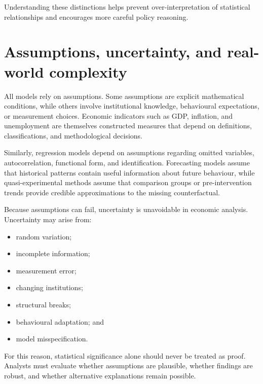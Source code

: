 \documentclass[
  11pt,
  oneside]{book}
\providecommand{\tightlist}{%
  \setlength{\itemsep}{0pt}\setlength{\parskip}{0pt}}
\begin{document}
Understanding these distinctions helps prevent over-interpretation of statistical relationships and encourages more careful policy reasoning.

\section{Assumptions, uncertainty, and real-world complexity}\label{assumptions-uncertainty-and-real-world-complexity}

All models rely on assumptions. Some assumptions are explicit mathematical conditions, while others involve institutional knowledge, behavioural expectations, or measurement choices. Economic indicators such as GDP, inflation, and unemployment are themselves constructed measures that depend on definitions, classifications, and methodological decisions.

Similarly, regression models depend on assumptions regarding omitted variables, autocorrelation, functional form, and identification. Forecasting models assume that historical patterns contain useful information about future behaviour, while quasi-experimental methods assume that comparison groups or pre-intervention trends provide credible approximations to the missing counterfactual.

Because assumptions can fail, uncertainty is unavoidable in economic analysis. Uncertainty may arise from:

\begin{itemize}
\tightlist
\item
  random variation;\\
\item
  incomplete information;\\
\item
  measurement error;\\
\item
  changing institutions;\\
\item
  structural breaks;\\
\item
  behavioural adaptation; and\\
\item
  model misspecification.
\end{itemize}

For this reason, statistical significance alone should never be treated as proof. Analysts must evaluate whether assumptions are plausible, whether findings are robust, and whether alternative explanations remain possible.
\end{document}
